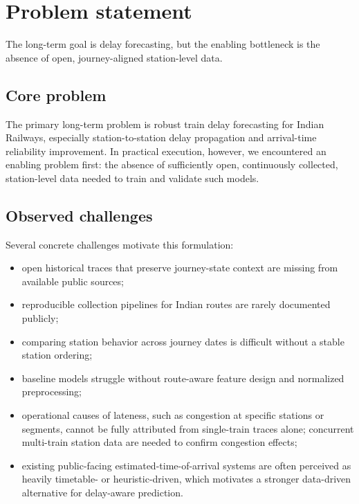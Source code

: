 \documentclass[a4paper,fleqn]{cas-dc}
\begin{document}
\section{Problem statement}
\label{sec:problem}

The long-term goal is delay forecasting, but the enabling bottleneck is the
absence of open, journey-aligned station-level data.

\subsection{Core problem}
The primary long-term problem is robust train delay forecasting for Indian
Railways, especially station-to-station delay propagation and
arrival-time reliability improvement. In practical execution, however, we
encountered an enabling problem first: the absence of sufficiently open,
continuously collected, station-level data needed to train and validate such
models.

\subsection{Observed challenges}
Several concrete challenges motivate this formulation:
\begin{itemize}
    \item open historical traces that preserve journey-state context are
          missing from available public sources;
    \item reproducible collection pipelines for Indian routes are rarely
          documented publicly;
    \item comparing station behavior across journey dates is difficult
          without a stable station ordering;
    \item baseline models struggle without route-aware feature design and
          normalized preprocessing;
    \item operational causes of lateness, such as congestion at specific
          stations or segments, cannot be fully attributed from single-train
          traces alone; concurrent multi-train station data are needed to
          confirm congestion effects;
    \item existing public-facing estimated-time-of-arrival systems are often
          perceived as heavily timetable- or heuristic-driven, which
          motivates a stronger data-driven alternative for delay-aware
          prediction.
\end{itemize}
\end{document}
